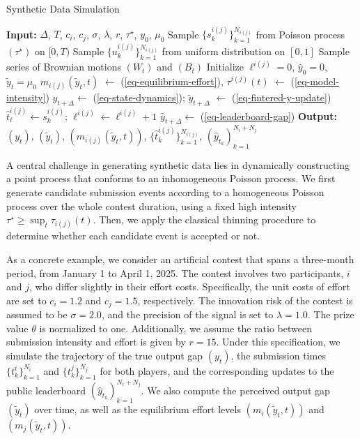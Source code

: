\documentclass[mnsc]{informs3}
\begin{document}
\begin{algorithm}[H]
\caption{Synthetic Data Simulation}
\label{algo-dgp}
\begin{algorithmic}
\STATE \textbf{Input:} 
	$\Delta$, $T$, $c_i$, $c_j$, $\sigma$, $\lambda$, $r$, $\tau^\star$, $y_0$, $\mu_0$
\STATE Sample $\{s_k^{i(j)}\}^{N_{i(j)}}_{k=1}$ from Poisson process $(\tau^\star)$ on $[0, T)$
\STATE Sample $\{u_k^{i(j)}\}^{N_{i(j)}}_{k=1}$ from uniform distribution on $[0, 1]$
\STATE Sample series of Brownian motions $(W_t)$ and $(B_t)$
\STATE Initialize $\ell^{i(j)}=0$, $\hat{y}_0 = 0$, $\tilde{y}_t=\mu_0$
    \STATE $m_{i(j)}(\tilde{y}_t, t)$  $\gets$ (\ref{eq-equilibrium-effort}), $\tau^{i(j)}(t)$ $\gets$ (\ref{eq-model-intensity})
    \hfill {}
    \STATE $y_{t+\Delta} \gets$ (\ref{eq-state-dynamics}); $\tilde{y}_{t+\Delta}$ $\gets$ (\ref{eq-fintered-y-update})
    \hfill {}
    \FOR{$s_{k}^{i(j)} \in [t, t+\Delta)$} 
        	    \STATE $\hat{t}^{i(j)}_{\ell} \gets s_{k}^{i(j)}$; $\ell^{i(j)} \gets \ell^{i(j)}+1$
	    \hfill {}
	    \STATE $\hat{y}_{t+\Delta} \gets $ (\ref{eq-leaderboard-gap})
	    \hfill {}
        \ENDIF
    \ENDFOR
\ENDFOR
\STATE \textbf{Output:} $(y_t)$, $(\tilde{y}_t)$, $(m_{i(j)}(\tilde{y}_t, t))$, $\{\hat{t}_k^{i(j)}\}^{N_{i(j)}}_{k=1}$, $(\hat{y}_{t_k})_{k=1}^{N_i + N_j}$
\end{algorithmic}
\end{algorithm}

A central challenge in generating synthetic data lies in dynamically constructing a point process that conforms to an inhomogeneous Poisson process.
We first generate candidate submission events according to a homogeneous Poisson process over the whole contest duration, using a fixed high intensity $\tau^\star \ge \sup_t \tau_{i(j)}(t)$.
Then, we apply the classical thinning procedure \citep{lewis1979simulation} to determine whether each candidate event is accepted or not.

As a concrete example, we consider an artificial contest that spans a three-month period, from January 1 to April 1, 2025.
The contest involves two participants, $i$ and $j$, who differ slightly in their effort costs.
Specifically, the unit costs of effort are set to $c_i = 1.2$ and $c_j = 1.5$, respectively. 
The innovation risk of the contest is assumed to be $\sigma = 2.0$, and the precision of the signal is set to $\lambda = 1.0$. 
The prize value $\theta$ is normalized to one. 
Additionally, we assume the ratio between submission intensity and effort is given by $r = 15$. 
Under this specification, we simulate the trajectory of the true output gap $(y_t)$, the submission times $\{t^i_k\}_{k=1}^{N_i}$ and $\{t^j_k\}_{k=1}^{N_j}$ for both players, and the corresponding updates to the public leaderboard $(\hat{y}_{t_k})_{k=1}^{N_i + N_j}$. 
We also compute the perceived output gap $(\tilde{y}_t)$ over time, as well as the equilibrium effort levels $(m_i(\tilde{y}_t, t))$ and $(m_j(\tilde{y}_t, t))$. 
\end{document}
